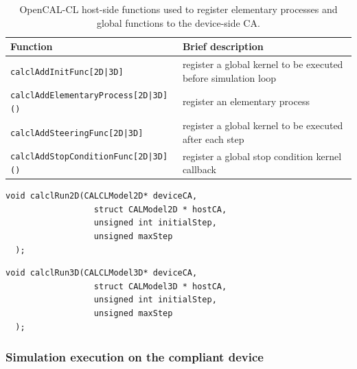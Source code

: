 \begin{table}
  \centering
  \begin{footnotesize}
  \begin{tabular}{l|l}
    \hline
    Function & Brief description\\
    \hline
    \verb'calclAddInitFunc[2D|3D]'             & register a global kernel to be executed before simulation loop \\
    \verb'calclAddElementaryProcess[2D|3D]()'  & register an elementary process \\
    \verb'calclAddSteeringFunc[2D|3D]'         & register a global kernel to be executed after each step \\
    \verb'calclAddStopConditionFunc[2D|3D]()'  & register a global stop condition kernel callback \\
    \hline
    \end{tabular}
    \end{footnotesize}
  \caption{OpenCAL-CL host-side functions used to register elementary processes and global functions to the device-side CA.}
  \label{tab:XXX}
\end{table}


\begin{lstlisting}[float,floatplacement=H, label=lst:calclRun2D, caption=The calclRun2D() function., numbers=none]
  void calclRun2D(CALCLModel2D* deviceCA,
                  struct CALModel2D * hostCA,
                  unsigned int initialStep,
                  unsigned maxStep
  );
\end{lstlisting}

\begin{lstlisting}[float,floatplacement=H, label=lst:calclRun3D, caption=The calclRun3D() function., numbers=none]
  void calclRun3D(CALCLModel3D* deviceCA,
                  struct CALModel3D * hostCA,
                  unsigned int initialStep,
                  unsigned maxStep
  );
\end{lstlisting}


\subsubsection{Simulation execution on the compliant device}

